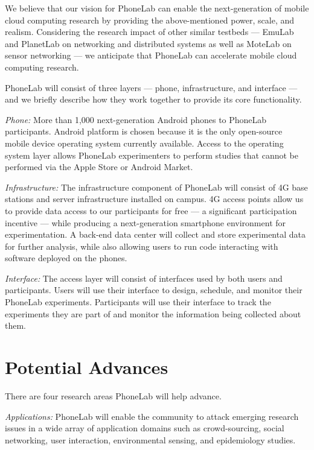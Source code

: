 We believe that our vision for PhoneLab can enable the next-generation of mobile cloud computing research by providing the above-mentioned power, scale, and realism. Considering the research impact of other similar testbeds --- EmuLab and PlanetLab on networking and distributed systems as well as MoteLab on sensor networking --- we anticipate that PhoneLab can accelerate mobile cloud computing research.

PhoneLab will consist of three layers --- phone, infrastructure, and
interface --- and we briefly describe how they work together to provide its
core functionality.

\emph{Phone:} More than 1,000 next-generation Android
phones to PhoneLab participants. Android platform is chosen
because it is the only open-source mobile device operating system
currently available.  Access to the operating system layer allows
PhoneLab experimenters to perform studies that cannot be performed via
the Apple Store or Android Market.

\emph{Infrastructure:} The infrastructure component of
PhoneLab will consist of 4G base stations and server infrastructure installed
on campus. 4G access points allow us to provide data access to our
participants for free --- a significant participation incentive --- while
producing a next-generation smartphone environment for experimentation. A
back-end data center will collect and store experimental data for further
analysis, while also allowing users to run code interacting with software
deployed on the phones.

\emph{Interface:} The access layer will consist of interfaces used
by both users and participants. Users will use their interface to design,
schedule, and monitor their PhoneLab experiments. Participants will use
their interface to track the experiments they are part of and monitor the
information being collected about them.



\section{Potential Advances} There are four research areas
PhoneLab will help advance. 
 

\emph{Applications:} PhoneLab will enable the community to attack emerging research issues in a wide array of application domains such as crowd-sourcing, social networking, user interaction, environmental sensing, and epidemiology studies. 

